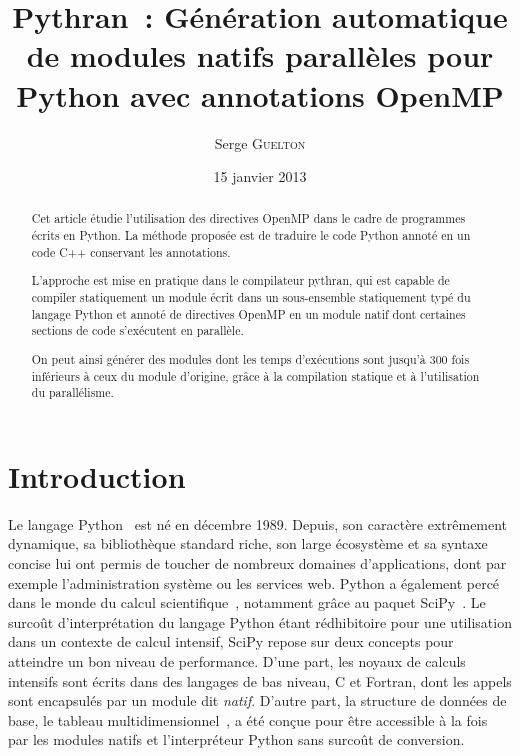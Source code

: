 \documentclass[renpar]{compas2013}
\begin{document}
\title{Pythran~: Génération automatique de modules natifs parallèles pour
Python avec annotations OpenMP}


\author{Serge \textsc{Guelton}}%

\address{Télécom Bretagne / École Normale Supérieure,\\
serge.guelton@telecom-bretagne.eu}

\date{15 janvier 2013}

\maketitle

\begin{abstract}
  Cet article étudie l'utilisation des directives OpenMP dans le cadre de
  programmes écrits en Python. La méthode proposée est de traduire le
  code Python annoté en un code C++ conservant les annotations.
  
  L'approche est mise en pratique dans le compilateur pythran, qui est
  capable de compiler statiquement un module écrit dans un sous-ensemble
  statiquement typé du langage Python et annoté de directives OpenMP en un
  module natif dont certaines sections de code s'exécutent en parallèle. 

  On peut ainsi générer des modules dont les temps d'exécutions sont
  jusqu'à 300 fois inférieurs à ceux du module d'origine, grâce à la compilation
  statique et à l'utilisation du parallélisme.
  
\end{abstract}

	
\section{Introduction}

Le langage Python~\cite{rossum97} est né en décembre 1989. Depuis, son
caractère extrêmement dynamique, sa bibliothèque standard riche, son large
écosystème et sa syntaxe concise lui ont permis de toucher de nombreux
domaines d'applications, dont par exemple l'administration système ou les
services web.  Python a également percé dans le monde du calcul
scientifique~\cite{Oliphant2007}, notamment grâce au paquet
SciPy~\cite{scipy}. Le surcoût d'interprétation du langage Python étant
rédhibitoire pour une utilisation dans un contexte de calcul intensif,
SciPy repose sur deux concepts pour atteindre un bon niveau de
performance. D'une part, les noyaux de calculs intensifs sont écrits dans
des langages de bas niveau, C et Fortran, dont les appels sont encapsulés
par un module dit \emph{natif}. D'autre part, la structure de données de
base, le tableau multidimensionnel~\cite{numpyarray2011}, a été conçue pour
être accessible à la fois par les modules natifs et l'interpréteur Python
sans surcoût de conversion.
\end{document}
